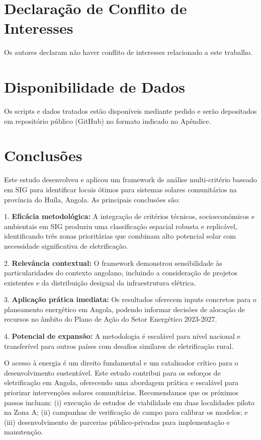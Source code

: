 \documentclass[12pt, a4paper]{article}
\begin{document}
\section*{Declaração de Conflito de Interesses}
Os autores declaram não haver conflito de interesses relacionado a este trabalho.

\section*{Disponibilidade de Dados}
Os scripts e dados tratados estão disponíveis mediante pedido e serão depositados em repositório público (GitHub) no formato indicado no Apêndice.

\section{Conclusões}

Este estudo desenvolveu e aplicou um framework de análise multi-critério baseado em SIG para identificar locais ótimos para sistemas solares comunitários na província do Huíla, Angola. As principais conclusões são:

1. \textbf{Eficácia metodológica:} A integração de critérios técnicos, socioeconómicos e ambientais em SIG produziu uma classificação espacial robusta e replicável, identificando três zonas prioritárias que combinam alto potencial solar com necessidade significativa de eletrificação.

2. \textbf{Relevância contextual:} O framework demonstrou sensibilidade às particularidades do contexto angolano, incluindo a consideração de projetos existentes e da distribuição desigual da infraestrutura elétrica.

3. \textbf{Aplicação prática imediata:} Os resultados oferecem inputs concretos para o planeamento energético em Angola, podendo informar decisões de alocação de recursos no âmbito do Plano de Ação do Setor Energético 2023-2027.

4. \textbf{Potencial de expansão:} A metodologia é escalável para nível nacional e transferível para outros países com desafios similares de eletrificação rural.

O acesso à energia é um direito fundamental e um catalisador crítico para o desenvolvimento sustentável. Este estudo contribui para os esforços de eletrificação em Angola, oferecendo uma abordagem prática e escalável para priorizar intervenções solares comunitárias. Recomendamos que os próximos passos incluam: (i) execução de estudos de viabilidade em duas localidades piloto na Zona A; (ii) campanhas de verificação de campo para calibrar os modelos; e (iii) desenvolvimento de parcerias público‑privadas para implementação e manutenção.
\end{document}
